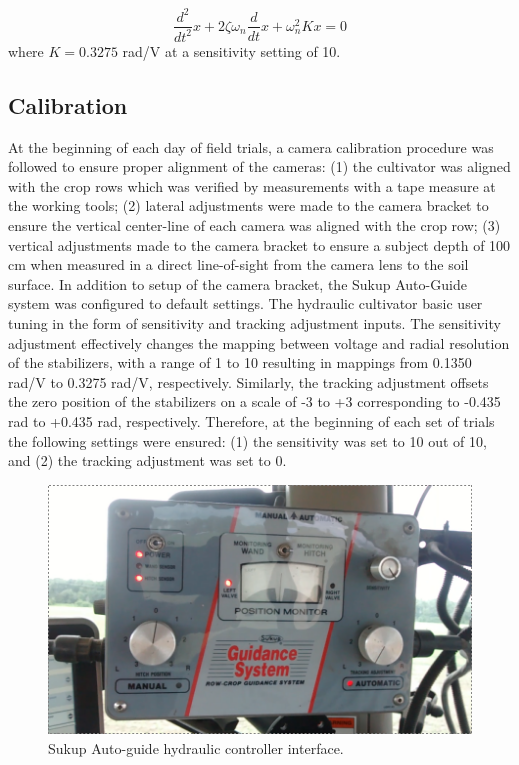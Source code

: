 \documentclass[authoryear]{elsarticle}
\begin{document}
\begin{equation}
  \frac{d^2}{dt^2}x + 2\zeta\omega_{n}\frac{d}{dt}x + \omega_{n}^2 Kx = 0 
  \label{eq:v_out}
\end{equation}
where $K=0.3275$ rad/V at a sensitivity setting of 10.

\subsection{Calibration}
At the beginning of each day of field trials, a camera calibration
procedure was followed to ensure proper alignment of the cameras: (1)
the cultivator was aligned with the crop rows which was verified by
measurements with a tape measure at the working tools; (2) lateral
adjustments were made to the camera bracket to ensure the vertical
center-line of each camera was aligned with the crop row; (3) vertical
adjustments made to the camera bracket to ensure a subject depth of
100 cm when measured in a direct line-of-sight from the camera lens to
the soil surface. In addition to setup of the camera bracket, the
Sukup Auto-Guide system was configured to default settings. The
hydraulic cultivator basic user tuning in the form of sensitivity and
tracking adjustment inputs. The sensitivity adjustment effectively
changes the mapping between voltage and radial resolution of the
stabilizers, with a range of 1 to 10 resulting in mappings from 0.1350
rad/V to 0.3275 rad/V, respectively. Similarly, the tracking
adjustment offsets the zero position of the stabilizers on a scale of
-3 to +3 corresponding to -0.435 rad to +0.435 rad,
respectively. Therefore, at the beginning of each set of trials the
following settings were ensured: (1) the sensitivity was set to 10 out
of 10, and (2) the tracking adjustment was set to 0.

\begin{figure}
  \centering
  \includegraphics[scale=0.3,natwidth=610,natheight=642]{sukup.png}
  \caption{Sukup Auto-guide hydraulic controller interface.}
  \label{fig:sukup}
\end{figure}
\end{document}
